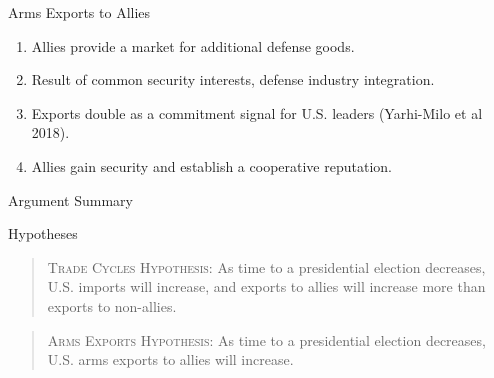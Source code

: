\documentclass[12pt]{beamer}
\begin{document}

\begin{frame}{Arms Exports to Allies}

\pause 
\begin{enumerate} 
\item Allies provide a market for additional defense goods.
\pause 
\item Result of common security interests, defense industry integration. 
\pause
\item Exports double as a commitment signal for U.S. leaders (Yarhi-Milo et al 2018). 
\pause
\item Allies gain security and establish a cooperative reputation.
\end{enumerate}


\end{frame} 


\begin{frame}[fragile]{Argument Summary}

\begin{figure}[htpb]
\end{figure}

\end{frame} 



\begin{frame}[fragile]{Hypotheses}

\begin{quote}
\textsc{Trade Cycles Hypothesis}: As time to a presidential election decreases, U.S. imports will increase, and exports to allies will increase more than exports to non-allies.
\end{quote}
\pause

\vspace{5mm}

\begin{quote}
\textsc{Arms Exports Hypothesis}: As time to a presidential election decreases, U.S. arms exports to allies will increase.
\end{quote}

\end{frame}
\end{document}
